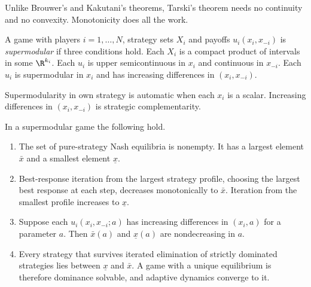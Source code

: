 Unlike Brouwer's and Kakutani's theorems, Tarski's theorem needs no continuity and no convexity. Monotonicity
does all the work.

\begin{definition}\label{def:B-smgame}
A game with players $i = 1, \dots, N$, strategy sets $X_i$ and payoffs $u_i(x_i, x_{-i})$ is \emph{supermodular} if
three conditions hold. Each $X_i$ is a compact product of intervals in some $\R^{k_i}$. Each $u_i$ is upper
semicontinuous in $x_i$ and continuous in $x_{-i}$. Each $u_i$ is supermodular in $x_i$ and has increasing differences
in $(x_i, x_{-i})$.
\end{definition}

Supermodularity in own strategy is automatic when each $x_i$ is a scalar. Increasing differences in
$(x_i, x_{-i})$ is strategic complementarity.

\begin{theorem}\label{thm:B-smgames}
In a supermodular game the following hold.
\begin{enumerate}[label=(\roman*)]
  \item The set of pure-strategy Nash equilibria is nonempty. It has a largest element $\bar x$ and a smallest
  element $\underline x$.
  \item Best-response iteration from the largest strategy profile, choosing the largest best response at each
  step, decreases monotonically to $\bar x$. Iteration from the smallest profile increases to $\underline x$.
  \item Suppose each $u_i(x_i, x_{-i}; a)$ has increasing differences in $(x_i, a)$ for a parameter $a$. Then $\bar x(a)$
  and $\underline x(a)$ are nondecreasing in $a$.
  \item Every strategy that survives iterated elimination of strictly dominated strategies lies between
  $\underline x$ and $\bar x$. A game with a unique equilibrium is therefore dominance solvable, and adaptive dynamics
  converge to it.
\end{enumerate}
\end{theorem}

